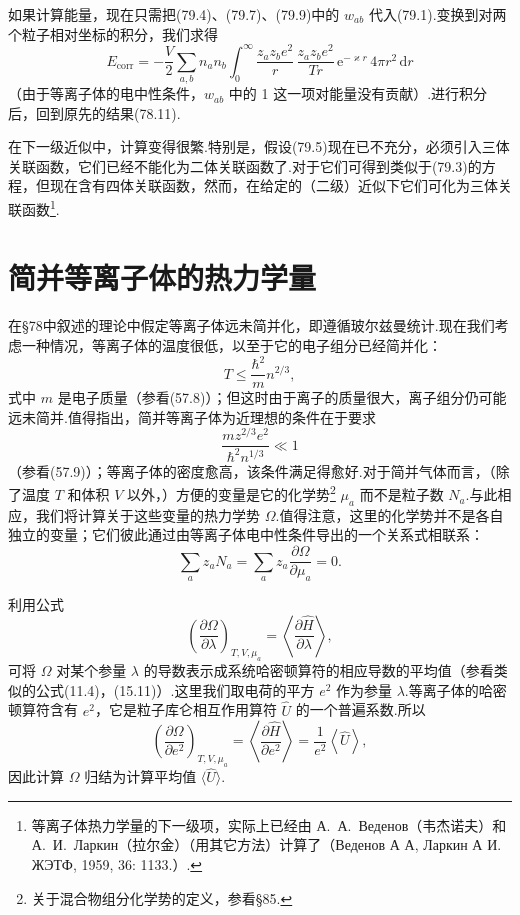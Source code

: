 如果计算能量，现在只需把(79.4)、(79.7)、(79.9)中的 $w_{ab}$ 代入(79.1).变换到对两个粒子相对坐标的积分，我们求得
\begin{equation*}
  E_{\mathrm{corr}}=-\frac{V}{2}\sum_{a,b}n_an_b\int_0^{\infty}
  \frac{z_az_be^2}{r}\,\frac{z_az_be^2}{Tr}\,
  \mathrm{e}^{-\varkappa r}\,4\pi r^2\,\mathrm{d}r
\end{equation*}
（由于等离子体的电中性条件，$w_{ab}$ 中的 1 这一项对能量没有贡献）.进行积分后，回到原先的结果(78.11).

在下一级近似中，计算变得很繁.特别是，假设(79.5)现在已不充分，必须引入三体关联函数，它们已经不能化为二体关联函数了.对于它们可得到类似于(79.3)的方程，但现在含有四体关联函数，然而，在给定的（二级）近似下它们可化为三体关联函数\footnote{等离子体热力学量的下一级项，实际上已经由 А.~А.~Веденов（韦杰诺夫）和 А.~И.~Ларкин（拉尔金）（用其它方法）计算了（Веденов А А, Ларкин А И. ЖЭТФ, 1959, 36: 1133.）.}.

\section{简并等离子体的热力学量}

在§78中叙述的理论中假定等离子体远未简并化，即遵循玻尔兹曼统计.现在我们考虑一种情况，等离子体的温度很低，以至于它的电子组分已经简并化：
\begin{equation}
  T\leqslant\frac{\hbar^2}{m}n^{2/3},
\end{equation}
式中 $m$ 是电子质量（参看(57.8)）；但这时由于离子的质量很大，离子组分仍可能远未简并.值得指出，简并等离子体为近理想的条件在于要求
\begin{equation}
  \frac{mz^{2/3}e^2}{\hbar^2n^{1/3}}\ll1
\end{equation}
（参看(57.9)）；等离子体的密度愈高，该条件满足得愈好.对于简并气体而言，（除了温度 $T$ 和体积 $V$ 以外，）方便的变量是它的化学势\footnote{关于混合物组分化学势的定义，参看§85.} $\mu_a$ 而不是粒子数 $N_a$.与此相应，我们将计算关于这些变量的热力学势 $\Omega$.值得注意，这里的化学势并不是各自独立的变量；它们彼此通过由等离子体电中性条件导出的一个关系式相联系：
\begin{equation}
  \sum_az_aN_a=\sum_az_a\frac{\partial\Omega}{\partial\mu_a}=0.
\end{equation}

利用公式
\begin{equation*}
  \left(\frac{\partial\Omega}{\partial\lambda}\right)_{T,V,\mu_a}
  =\left\langle\frac{\partial\hat{H}}{\partial\lambda}\right\rangle,
\end{equation*}
可将 $\Omega$ 对某个参量 $\lambda$ 的导数表示成系统哈密顿算符的相应导数的平均值（参看类似的公式(11.4)，(15.11)）.这里我们取电荷的平方 $e^2$ 作为参量 $\lambda$.等离子体的哈密顿算符含有 $e^2$，它是粒子库仑相互作用算符 $\hat{U}$ 的一个普遍系数.所以
\begin{equation}
  \left(\frac{\partial\Omega}{\partial e^2}\right)_{T,V,\mu_a}
  =\left\langle\frac{\partial\hat{H}}{\partial e^2}\right\rangle
  =\frac{1}{e^2}\left\langle\hat{U}\right\rangle,
\end{equation}
因此计算 $\Omega$ 归结为计算平均值 $\langle\hat{U}\rangle$.

